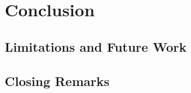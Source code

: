 \chapter{Conclusion} \label{chap:conclusion}

\section{Limitations and Future Work}
\section{Closing Remarks}